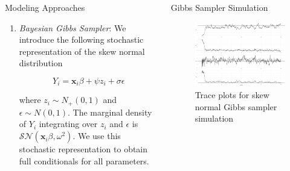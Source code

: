 \documentclass[final]{beamer}
\newlength{\onecolwid}
\newlength{\twocolwid}
\begin{document}
\begin{frame}[t]
\begin{columns}[t]
\begin{column}{\twocolwid}
\begin{columns}[t,totalwidth=\twocolwid]
\begin{column}{\onecolwid}
\begin{block}{Modeling Approaches}
\begin{enumerate}
\item \textit{Bayesian Gibbs Sampler}: We introduce the following stochastic representation of the skew normal distribution 

$$Y_i = \mathbf{x}_i \beta + \psi z_i + \sigma \epsilon$$

where $z_i \sim N_+(0,1)$ and $\epsilon \sim N(0,1)$. The marginal density of $Y_i$ integrating over $z_i$ and $\epsilon$ is $\mathcal{SN}(\mathbf{x}_i \beta, \omega^2)$. We use this stochastic representation to obtain full conditionals for all parameters. 

\end{enumerate}

\end{block}


\end{column} %

\begin{column}{\onecolwid} %


\begin{block}{Gibbs Sampler Simulation}

\begin{figure}
\includegraphics[width=1\linewidth]{sim-trace.pdf}
\caption{Trace plots for skew normal Gibbs sampler simulation}
\end{figure}


\end{block}
\end{column}
\end{columns}
\end{column}
\end{columns}
\end{frame}
\end{document}
